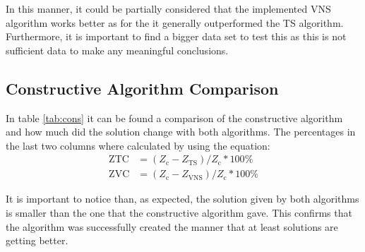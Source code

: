 \documentclass[10pt,twoside]{article}
\begin{document}
In this manner, it could be partially considered that the implemented
VNS algorithm works better as for the it generally outperformed the TS
algorithm. Furthermore, it is important to find a bigger data set to
test this as this is not sufficient data to make any meaningful
conclusions.

\subsection{Constructive Algorithm Comparison}
In table \ref{tab:cons} it can be found a comparison of the constructive algorithm and how much did the solution change with both algorithms. The percentages in the last two columns where calculated by using the equation:
\begin{equation}
  \begin{split}
    \text{ZTC} &= (Z_\text{c} - Z_{\text{TS}})/Z_\text{c} * 100\% \\
    \text{ZVC} &= (Z_\text{c} - Z_{\text{VNS}})/Z_\text{c} * 100\%
  \end{split}
\end{equation}

It is important to notice than, as expected, the solution given by
both algorithms is smaller than the one that the constructive
algorithm gave. This confirms that the algorithm was successfully
created the manner that at least solutions are getting better.
\end{document}
